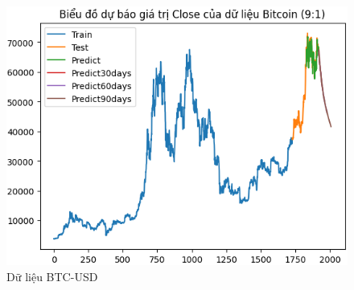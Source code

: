 \documentclass[conference]{IEEEtran}
\begin{document}
\begin{figure}[H]
\begin{minipage}{0.15\textwidth}
    \includegraphics[width=1\textwidth]{Figure/RNN_BTC91.png}
    \end{minipage}
    \caption{Dữ liệu BTC-USD}
    \label{fig:1}
\end{figure}
\end{document}
